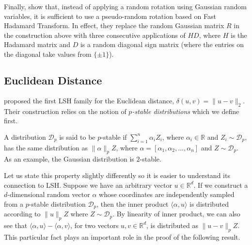 Finally, \cite{andoni2015cross-polytope-lsh} show that,
instead of applying a random rotation using Gaussian random variables, it is sufficient to
use a pseudo-random rotation based on Fast Hadamard Transform. In effect,
they replace the random Gaussian matrix $R$ in the construction above with
three consecutive applications of $HD$, where $H$ is the Hadamard matrix
and $D$ is a random diagonal sign matrix (where the entries on the diagonal take
values from $\{\pm 1\}$).

\subsection{Euclidean Distance}
\label{section:lsh:euclidean}
\cite{datar2004pstable-lsh} proposed the first LSH family for the Euclidean distance,
$\delta(u, v) = \lVert u - v \rVert_2$. Their construction relies on the notion of
\emph{$p$-stable distributions} which we define first.

\begin{definition}
    A distribution $\mathcal{D}_p$ is said to be $p$-stable if $\sum_{i=1}^n \alpha_i Z_i$,
    where $\alpha_i \in \mathbb{R}$ and $Z_i \sim \mathcal{D}_p$, has the same distribution
    as $\lVert \alpha \rVert_p Z$, where $\alpha = [\alpha_1, \alpha_2, \ldots, \alpha_n ]$
    and $Z \sim \mathcal{D}_p$. As an example, the Gaussian distribution is $2$-stable.
\end{definition}

Let us state this property slightly differently so it is easier to understand its
connection to LSH. Suppose we have an arbitrary vector $u \in \mathbb{R}^d$.
If we construct a $d$-dimensional random vector $\alpha$ whose coordinates are independently sampled from
a $p$-stable distribution $\mathcal{D}_p$, then the inner product $\langle \alpha, u \rangle$ is
distributed according to $\lVert u \rVert_p Z$ where $Z \sim \mathcal{D}_p$.
By linearity of inner product, we can also see that $\langle \alpha, u \rangle - \langle \alpha, v \rangle$,
for two vectors $u, v \in \mathbb{R}^d$, is distributed as $\lVert u - v \rVert_p Z$.
This particular fact plays an important role in the proof of the following result.

